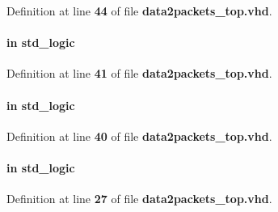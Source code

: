 Definition at line {\bf 44} of file {\bf data2packets\+\_\+top.\+vhd}.

\paragraph[{chirp\+\_\+sync\+\_\+en}]{ {\bfseries \textcolor{keywordflow}{in}\textcolor{vhdlchar}{ }} {\bfseries \textcolor{comment}{std\+\_\+logic}\textcolor{vhdlchar}{ }} \hspace{0.3cm}{\ttfamily [Port]}}\label{classdata2packets__top_a2eb0dd53d4912cecebab02d114ed6707}


Definition at line {\bf 41} of file {\bf data2packets\+\_\+top.\+vhd}.

\paragraph[{chirp\+\_\+sync\+\_\+trig}]{ {\bfseries \textcolor{keywordflow}{in}\textcolor{vhdlchar}{ }} {\bfseries \textcolor{comment}{std\+\_\+logic}\textcolor{vhdlchar}{ }} \hspace{0.3cm}{\ttfamily [Port]}}\label{classdata2packets__top_ae249f7fa1e7b628c16cc1e8d4cfc7089}


Definition at line {\bf 40} of file {\bf data2packets\+\_\+top.\+vhd}.

\paragraph[{clk}]{ {\bfseries \textcolor{keywordflow}{in}\textcolor{vhdlchar}{ }} {\bfseries \textcolor{comment}{std\+\_\+logic}\textcolor{vhdlchar}{ }} \hspace{0.3cm}{\ttfamily [Port]}}\label{classdata2packets__top_a4a4609c199d30b3adebbeb3a01276ec5}


Definition at line {\bf 27} of file {\bf data2packets\+\_\+top.\+vhd}.

